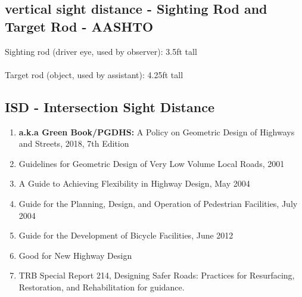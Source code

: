 \documentclass{article}
\begin{document}
  





  \subsection{vertical sight distance - Sighting Rod and Target Rod - AASHTO}
  Sighting rod (driver eye, used by observer):  3.5ft tall \\
  \\
  Target rod (object, used by assistant): 4.25ft tall
  \\


  \subsection{ISD - Intersection Sight Distance}
  \begin{enumerate}
    \item \textbf{a.k.a Green Book/PGDHS:} A Policy on Geometric Design of Highways and Streets, 2018, 7th Edition
    \item Guidelines for Geometric Design of Very Low Volume Local Roads, 2001
    \item A Guide to Achieving Flexibility in Highway Design, May 2004
    \item Guide for the Planning, Design, and Operation of Pedestrian Facilities, July 2004
    \item Guide for the Development of Bicycle Facilities, June 2012

    \item Good for New Highway Design 
    \item TRB Special Report 214, Designing Safer Roads: Practices for Resurfacing, Restoration, and Rehabilitation for guidance. \\
  \end{enumerate}

  
\end{document}
